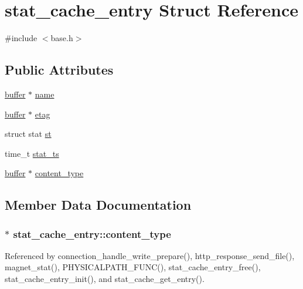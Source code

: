\hypertarget{structstat__cache__entry}{\section{stat\-\_\-cache\-\_\-entry Struct Reference}
\label{structstat__cache__entry}
}


{\ttfamily \#include $<$base.\-h$>$}

\subsection*{Public Attributes}
\begin{DoxyCompactItemize}
\item 
\hyperlink{structbuffer}{buffer} $\ast$ \hyperlink{structstat__cache__entry_afbc3b1fcadd4ac484e039c742dd29c83}{name}
\item 
\hyperlink{structbuffer}{buffer} $\ast$ \hyperlink{structstat__cache__entry_abe2703eb4d75aa483b12133ca4f608ea}{etag}
\item 
struct stat \hyperlink{structstat__cache__entry_a6a8f35128e25cbae3f682e5481894037}{st}
\item 
time\-\_\-t \hyperlink{structstat__cache__entry_a78ae66597db0f86aebfd4f8595057704}{stat\-\_\-ts}
\item 
\hyperlink{structbuffer}{buffer} $\ast$ \hyperlink{structstat__cache__entry_abbfccd58128a259c6506766e501d3768}{content\-\_\-type}
\end{DoxyCompactItemize}


\subsection{Member Data Documentation}
\hypertarget{structstat__cache__entry_abbfccd58128a259c6506766e501d3768}{
\subsubsection[{content\-\_\-type}]{$\ast$ stat\-\_\-cache\-\_\-entry\-::content\-\_\-type}}\label{structstat__cache__entry_abbfccd58128a259c6506766e501d3768}


Referenced by connection\-\_\-handle\-\_\-write\-\_\-prepare(), http\-\_\-response\-\_\-send\-\_\-file(), magnet\-\_\-stat(), P\-H\-Y\-S\-I\-C\-A\-L\-P\-A\-T\-H\-\_\-\-F\-U\-N\-C(), stat\-\_\-cache\-\_\-entry\-\_\-free(), stat\-\_\-cache\-\_\-entry\-\_\-init(), and stat\-\_\-cache\-\_\-get\-\_\-entry().

